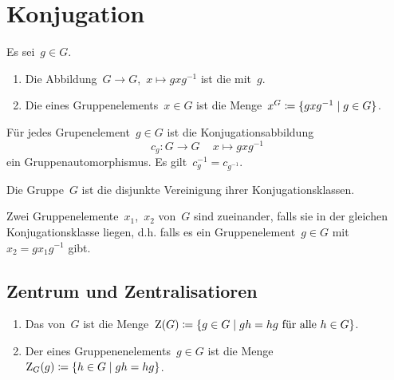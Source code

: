 \section{Konjugation}

\begin{definition}
  Es sei~$g \in G$.
  \begin{enumerate}
    \item
      Die Abbildung~$G \to G$,~$x \mapsto g x g^{-1}$ ist die  mit~$g$.
    \item
      Die  eines Gruppenelements~$x \in G$ ist die Menge~$x^G \defined \{ g x g^{-1} \suchthat g \in G \}$.
  \end{enumerate}
\end{definition}

\begin{proposition}
  Für jedes Grupenelement~$g \in G$ ist die Konjugationsabbildung
  \[
    c_g
    \colon
    G \to G \,
    \quad
    x \mapsto g x g^{-1}
  \]
  ein Gruppenautomorphismus.
  Es gilt~$c_g^{-1} = c_{g^{-1}}$.
\end{proposition}

\begin{proposition}
  Die Gruppe~$G$ ist die disjunkte Vereinigung ihrer Konjugationsklassen.
\end{proposition}

\begin{definition}
  Zwei Gruppenelemente~$x_1$,~$x_2$ von~$G$ sind  zueinander, falls sie in der gleichen Konjugationsklasse liegen, d.h. falls es ein Gruppenelement~$g \in G$ mit~$x_2 = g x_1 g^{-1}$ gibt.
\end{definition}



\subsection{Zentrum und Zentralisatioren}

\begin{definition}
  \leavevmode
  \begin{enumerate}
    \item
      Das  von~$G$ ist die Menge~$\zenter(G) \defined \{ g \in G \suchthat \text{$g h = h g$ für alle~$h \in G$} \}$.
    \item
      Der  eines Gruppenenelements~$g \in G$ ist die Menge~$\zentralizer_G(g) \defined \{ h \in G \suchthat gh = hg \}$.
  \end{enumerate}
\end{definition}

